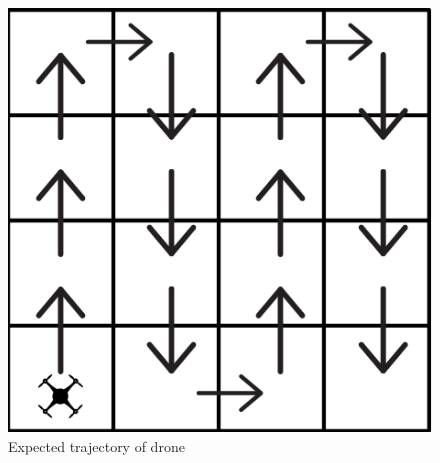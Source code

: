 \documentclass[
  journal=largetwo,
  manuscript=article-type,
  year=2023,
  volume=1,
]{iitp-journal}
\begin{document}
\begin{figure}
    \centering
    \includegraphics[width=0.6\linewidth]{path.png}
    \caption{Expected trajectory of drone}
    \label{fig_path}
\end{figure}
\end{document}
